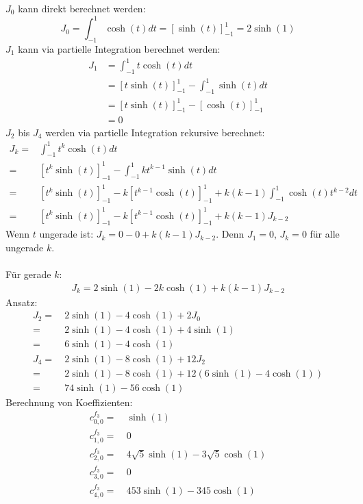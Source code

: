 $J_0$ kann direkt berechnet werden:
\begin{equation}
	J_0 = \int_{-1}^{1} \cosh (t)dt = \left[\sinh(t)\right]^1_{-1} = 2\sinh(1)
\end{equation}
$J_1$ kann via partielle Integration berechnet werden:
\begin{align}
	J_1 & = \int_{-1}^{1} t \cosh(t) dt \\
	 	& = \left[t\sinh(t)\right]^{1}_{-1} - \int_{-1}^{1} \sinh(t) dt \\
	 	& = \left[t\sinh(t)\right]^{1}_{-1} - \left[\cosh(t)\right]^{1}_{-1} \\
	 	& = 0
\end{align}
$J_2$ bis $J_4$ werden via partielle Integration rekursive berechnet: 
\begin{align}
	J_k = & \int_{-1}^{1} t^k \cosh(t) dt \\
		= & \left[t^k\sinh(t)\right]_{-1}^{1} - \int_{-1}^{1}k t^{k-1} \sinh(t) dt \\
		= & \left[t^k\sinh(t)\right]_{-1}^{1} - k\left[t^{k-1}\cosh(t)\right]_{-1}^{1} + k(k-1)\int_{-1}^{1} \cosh(t)t^{k-2}dt \\
		= & \left[t^k\sinh(t)\right]_{-1}^{1} - k\left[t^{k-1}\cosh(t)\right]_{-1}^{1} + k(k-1)J_{k-2}
\end{align}
Wenn $t$ ungerade ist: $J_k = 0-0+k(k-1)J_{k-2}$. Denn $J_1 = 0$, $J_k = 0$ für alle ungerade $k$. \\\\
Für gerade $k$:
\begin{align}
	J_k = 2\sinh(1) - 2k\cosh(1) + k(k-1)J_{k-2} 
\end{align}
Ansatz:
\begin{align}
	J_2 = \ & 2\sinh(1) - 4\cosh(1) + 2J_0 \\
	= \ & 2\sinh(1) - 4\cosh(1) + 4 \sinh(1) \\
	= \ & 6\sinh(1) - 4\cosh(1) \\
	J_4 = \ & 2\sinh(1) - 8\cosh(1) + 12 J_2\\
		= \ & 2\sinh(1) - 8\cosh(1) + 12 (6\sinh(1) - 4\cosh(1))\\
		= \ & 74 \sinh(1) - 56\cosh(1)
\end{align}
Berechnung von Koeffizienten:
\begin{align}
	c_{0,0}^{f_3} = \ & \sinh(1) \\
	c_{1,0}^{f_3} = \ & 0 \\
	c_{2,0}^{f_3} = \ & 4\sqrt{5}\sinh(1) - 3\sqrt{5} \cosh(1) \\
	c_{3,0}^{f_3} = \ & 0 \\
	c_{4,0}^{f_3} = \ & 453\sinh(1) - 345\cosh(1)
\end{align}

